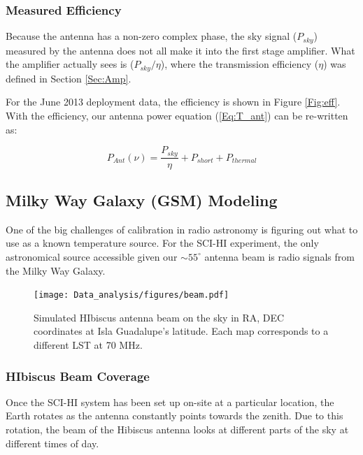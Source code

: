 \subsubsection{Measured Efficiency}

Because the antenna has a non-zero complex phase, the sky signal ($P_{sky}$) measured by the antenna does not all make it into the first stage amplifier. What the amplifier actually sees is ($P_{sky}/\eta$), where the transmission efficiency ($\eta$) was defined in Section \ref{Sec:Amp}. 

For the June 2013 deployment data, the efficiency is shown in Figure \ref{Fig:eff}. With the efficiency, our antenna power equation (\ref{Eq:T_ant}) can be re-written as:

\begin{equation}
P_{Ant}(\nu) = \frac{P_{sky}}{\eta} + P_{short} +P_{thermal}
\end{equation}


\subsection{Milky Way Galaxy (GSM) Modeling} \label{Sec:model}

One of the big challenges of calibration in radio astronomy is figuring out what to use as a known temperature source. For the SCI-HI experiment, the only astronomical source accessible given our $\sim 55 ^\circ$ antenna beam is radio signals from the Milky Way Galaxy. 

\begin{figure}[htb]
\begin{center}
\texttt{[image: Data\_analysis/figures/beam.pdf]}
\caption{Simulated HIbiscus antenna beam on the sky in RA, DEC coordinates at Isla Guadalupe's latitude. Each map corresponds to a different LST at 70 MHz. }
\label{Fig:HIbiscus_beam}
\end{center}
\end{figure}

\subsubsection{HIbiscus Beam Coverage}

Once the SCI-HI system has been set up on-site at a particular location, the Earth rotates as the antenna constantly points towards the zenith. Due to this rotation, the beam of the Hibiscus antenna looks at different parts of the sky at different times of day. 

